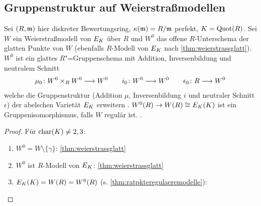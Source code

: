\documentclass[german]{scrreprt}
\begin{document}
\subsection{Gruppenstruktur auf Weierstraßmodellen}

\begin{Lemma}\label{thm:erweiterunggruppenstruktur}
  Sei $(R,\mathfrak{m})$ hier diskreter Bewertungsring,
  $\kappa(\mathfrak{m})=R/\mathfrak{m}$ perfekt,
  $K=\operatorname{Quot}(R)$.
  Sei $W$ ein Weierstraßmodell von $E_{K}$ über $R$ und
  $W^0$ das offene $R$-Unterschema der glatten Punkte von $W$ 
  (ebenfalls $R$-Modell von $E_{K}$ nach \autoref{thm:weierstrassglatt}).
  $W^0$ ist ein glattes $R$"=Gruppenschema
  mit Addition, Inversenbildung und neutralem Schnitt
  \begin{gather*}
    \mu_0\colon W^0\times_R W^0 \longrightarrow W^0
    \qquad
    i_0\colon W^0\longrightarrow W^0
    \qquad
    \epsilon_0\colon R\longrightarrow W^0
  \end{gather*}
  welche die Gruppenstruktur (Addition $\mu$, Inversenbildung $i$ und
  neutraler Schnitt $\epsilon$)
  der abelschen Varietät $E_{K}$ erweitern
  \cite[Theorem IV.5.3 (c)]{silverman2}.
  $W^0(R)\to W(R) \cong E_{K}(K)$ ist ein Gruppenisomorphismus,
  falls $W$ regulär ist.
  \cite[Theorem IV.5.3 (b)]{silverman2}.
  \begin{proof} Für $\operatorname{char}(K)\neq 2,3$:
    \begin{enumerate}
    \item $W^0=W\setminus\{\gamma\}$: \autoref{thm:weierstrassglatt}
    \item $W^0$ ist $R$-Modell von $E_{K}$: \autoref{thm:weierstrassglatt}
    \item \cite[Corollary IV.4.4]{silverman2}
      $E_{K}(K)=W(R)=W^0(R)$
      (s. \autoref{thm:ratpkteregulaeremodelle}):

\end{enumerate}
\end{proof}
\end{Lemma}
\end{document}
